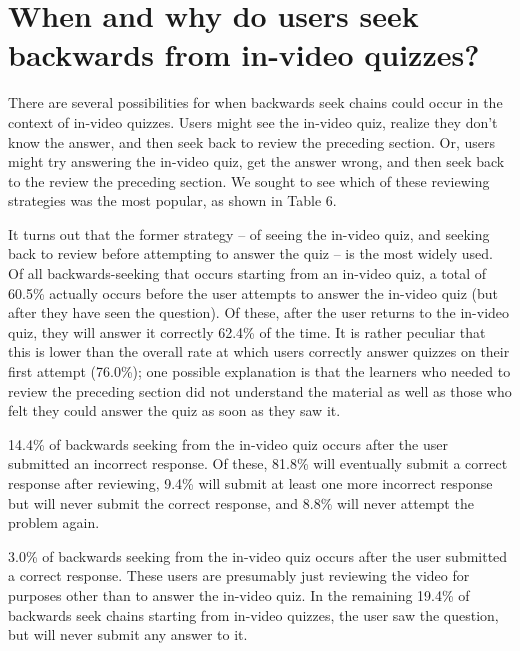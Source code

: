 \documentclass{sigchi}
\begin{document}

\section{When and why do users seek backwards from in-video quizzes?}

There are several possibilities for when backwards seek chains could occur in the context of in-video quizzes. Users might see the in-video quiz, realize they don't know the answer, and then seek back to review the preceding section. Or, users might try answering the in-video quiz, get the answer wrong, and then seek back to the review the preceding section. We sought to see which of these reviewing strategies was the most popular, as shown in Table 6.

It turns out that the former strategy -- of seeing the in-video quiz, and seeking back to review before attempting to answer the quiz -- is the most widely used. Of all backwards-seeking that occurs starting from an in-video quiz, a total of 60.5\% actually occurs before the user attempts to answer the in-video quiz (but after they have seen the question). Of these, after the user returns to the in-video quiz, they will answer it correctly 62.4\% of the time. It is rather peculiar that this is lower than the overall rate at which users correctly answer quizzes on their first attempt (76.0\%); one possible explanation is that the learners who needed to review the preceding section did not understand the material as well as those who felt they could answer the quiz as soon as they saw it.

14.4\% of backwards seeking from the in-video quiz occurs after the user submitted an incorrect response. Of these, 81.8\% will eventually submit a correct response after reviewing, 9.4\% will submit at least one more incorrect response but will never submit the correct response, and 8.8\% will never attempt the problem again.

3.0\% of backwards seeking from the in-video quiz occurs after the user submitted a correct response. These users are presumably just reviewing the video for purposes other than to answer the in-video quiz. In the remaining 19.4\% of backwards seek chains starting from in-video quizzes, the user saw the question, but will never submit any answer to it.
\end{document}
